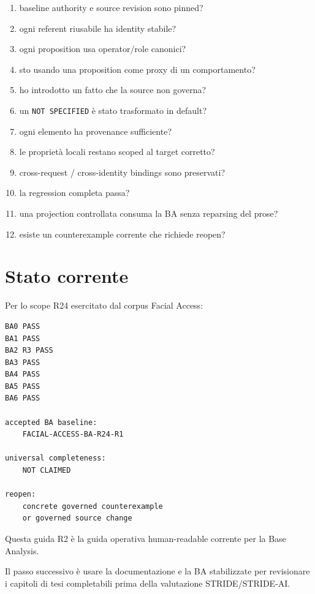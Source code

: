 \documentclass[11pt,a4paper]{article}
\newcommand{\code}[1]{\nolinkurl{#1}}
\begin{document}
\begin{enumerate}
\item baseline authority e source revision sono pinned?
\item ogni referent riusabile ha identity stabile?
\item ogni proposition usa operator/role canonici?
\item sto usando una proposition come proxy di un comportamento?
\item ho introdotto un fatto che la source non governa?
\item un \code{NOT SPECIFIED} è stato trasformato in default?
\item ogni elemento ha provenance sufficiente?
\item le proprietà locali restano scoped al target corretto?
\item cross-request / cross-identity bindings sono preservati?
\item la regression completa passa?
\item una projection controllata consuma la BA senza reparsing del prose?
\item esiste un counterexample corrente che richiede reopen?
\end{enumerate}

\section{Stato corrente}

Per lo scope R24 esercitato dal corpus Facial Access:

\begin{lstlisting}
BA0 PASS
BA1 PASS
BA2 R3 PASS
BA3 PASS
BA4 PASS
BA5 PASS
BA6 PASS

accepted BA baseline:
    FACIAL-ACCESS-BA-R24-R1

universal completeness:
    NOT CLAIMED

reopen:
    concrete governed counterexample
    or governed source change
\end{lstlisting}

Questa guida R2 è la guida operativa human-readable corrente per la Base Analysis.

Il passo successivo è usare la documentazione e la BA stabilizzate per revisionare i capitoli di tesi completabili prima della valutazione STRIDE/STRIDE-AI.
\end{document}
